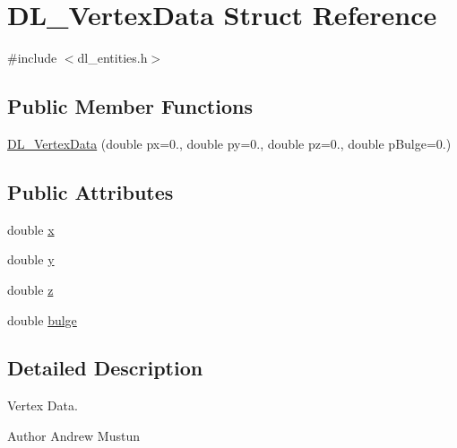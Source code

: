 \hypertarget{structDL__VertexData}{\section{D\-L\-\_\-\-Vertex\-Data Struct Reference}
\label{structDL__VertexData}
}


{\ttfamily \#include $<$dl\-\_\-entities.\-h$>$}

\subsection*{Public Member Functions}
\begin{DoxyCompactItemize}
\item 
\hyperlink{structDL__VertexData_ab3a9547768eb4350d8d37e01f147a0c4}{D\-L\-\_\-\-Vertex\-Data} (double px=0., double py=0., double pz=0., double p\-Bulge=0.)
\end{DoxyCompactItemize}
\subsection*{Public Attributes}
\begin{DoxyCompactItemize}
\item 
double \hyperlink{structDL__VertexData_a168a957a0d90f9e70fd15ac425cff96e}{x}
\item 
double \hyperlink{structDL__VertexData_a694708acaf3c4098655b4a2935ba73b3}{y}
\item 
double \hyperlink{structDL__VertexData_ad0b4cb8d62a48d311eac86dbd05fd994}{z}
\item 
double \hyperlink{structDL__VertexData_ac9367972a432ffeecdcc44aceca016c4}{bulge}
\end{DoxyCompactItemize}


\subsection{Detailed Description}
Vertex Data.

\begin{DoxyAuthor}{Author}
Andrew Mustun 
\end{DoxyAuthor}


